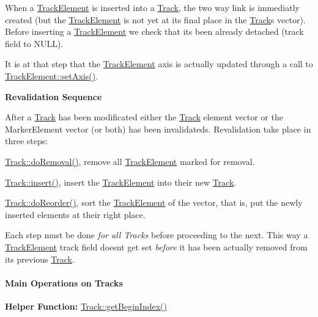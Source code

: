 When a \mbox{\hyperlink{classKite_1_1TrackElement}{Track\+Element}} is inserted into a \mbox{\hyperlink{classKite_1_1Track}{Track}}, the two way link is immediatly created (but the \mbox{\hyperlink{classKite_1_1TrackElement}{Track\+Element}} is not yet at it\textquotesingle{}s final place in the \mbox{\hyperlink{classKite_1_1Track}{Track}}\textquotesingle{}s vector). Before inserting a \mbox{\hyperlink{classKite_1_1TrackElement}{Track\+Element}} we check that it\textquotesingle{}s been already detached ({\ttfamily track} field to {\ttfamily N\+U\+LL}).

It is at that step that the \mbox{\hyperlink{classKite_1_1TrackElement}{Track\+Element}} axis is actually updated through a call to \mbox{\hyperlink{classKite_1_1TrackElement_a45e685b1e3ee630d24bf43746553af4c}{Track\+Element\+::set\+Axis()}}.

{\bfseries Revalidation Sequence}

After a \mbox{\hyperlink{classKite_1_1Track}{Track}} has been modificated either the \mbox{\hyperlink{classKite_1_1Track}{Track}} element vector or the Marker\+Element vector (or both) has been invalidateds. Revalidation take place in three steps\+:
\begin{DoxyItemize}
\item \mbox{\hyperlink{classKite_1_1Track_abfffcd781865b94f62f27a1e7be99a38}{Track\+::do\+Removal()}}, remove all \mbox{\hyperlink{classKite_1_1TrackElement}{Track\+Element}} marked for removal.
\item \mbox{\hyperlink{classKite_1_1Track_aa392ba7cf1e3e485aac11cf326e31918}{Track\+::insert()}}, insert the \mbox{\hyperlink{classKite_1_1TrackElement}{Track\+Element}} into their new \mbox{\hyperlink{classKite_1_1Track}{Track}}.
\item \mbox{\hyperlink{classKite_1_1Track_aaccb9224f5b38ecd8506fd1eec9ef5ca}{Track\+::do\+Reorder()}}, sort the \mbox{\hyperlink{classKite_1_1TrackElement}{Track\+Element}} of the vector, that is, put the newly inserted elements at their right place.
\end{DoxyItemize}

Each step must be done {\itshape for all Tracks} before proceeding to the next. This way a \mbox{\hyperlink{classKite_1_1TrackElement}{Track\+Element}} {\ttfamily track} field doesn\textquotesingle{}t get set {\itshape before} it has been actually removed from it\textquotesingle{}s previous \mbox{\hyperlink{classKite_1_1Track}{Track}}.\hypertarget{classKite_1_1Track_ssecTrackOperations}{}\paragraph{Main Operations on Tracks}\label{classKite_1_1Track_ssecTrackOperations}
{\bfseries Helper Function\+:} \mbox{\hyperlink{classKite_1_1Track_a33a6c0eebb0d4d50f639ae49a4d6252f}{Track\+::get\+Begin\+Index()}}

